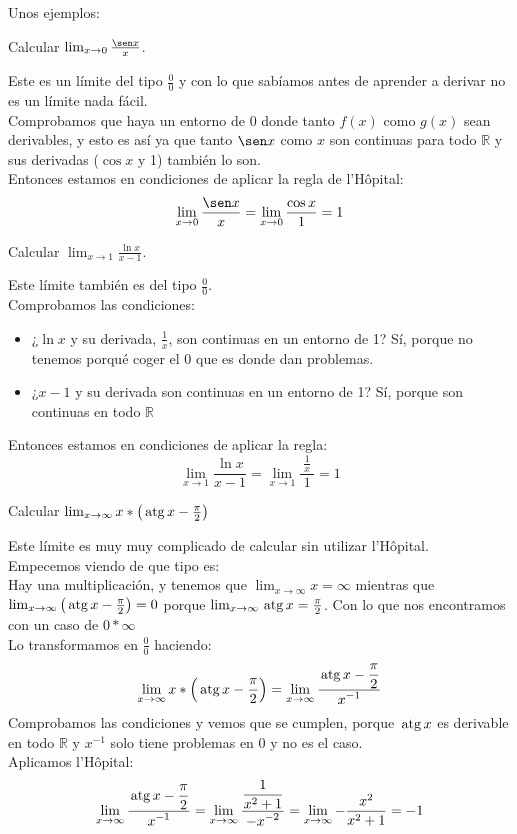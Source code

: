 \documentclass[a4paper,11pt,answers]{exam}
\newcommand\ddfrac[2]{\frac{\displaystyle #1}{\displaystyle #2}}
\begin{document}
Unos ejemplos:
\begin{questions}
\question Calcular $\lim_{x \to 0} \frac{\sen x}{x}$.
\begin{solution}
Este es un límite del tipo $\frac{0}{0}$ y con lo que sabíamos antes de aprender a derivar no es un límite nada fácil.\\ Comprobamos que haya un entorno de 0 donde tanto $f(x)$ como $g(x)$ sean derivables, y esto es así ya que tanto $\sen x$ como $x$ son continuas para todo $\mathbb{R}$ y sus derivadas ($\cos x$ y 1) también lo son.\\
Entonces estamos en condiciones de aplicar la regla de l'Hôpital:
\[\lim_{x \to 0} \frac{\sen x}{x} = \lim_{x \to 0} \frac{\cos x}{1} = 1\]
\end{solution}

\question Calcular $\lim_{x \to 1} \frac{\ln x}{x - 1}$.
\begin{solution}
Este límite también es del tipo $\frac{0}{0}$.\\
Comprobamos las condiciones:
\begin{itemize}
	\item ¿$\ln x$ y su derivada, $\frac{1}{x}$, son continuas en un entorno de 1? Sí, porque no tenemos porqué coger el 0 que es donde dan problemas.
	\item ¿$x -1$ y su derivada son continuas en un entorno de 1? Sí, porque son continuas en todo $\mathbb{R}$
\end{itemize}
Entonces estamos en condiciones de aplicar la regla:
\[\lim_{x \to 1} \frac{\ln x}{x - 1} = \lim_{x \to 1} \ddfrac{\ \frac{1}{x}\ }{1} = 1\]
\end{solution}
\question Calcular $\lim_{x \to \infty} x*\left(\,\mathrm{atg}\, x - \frac{\pi}{2}\right)$
\begin{solution}
Este límite es muy muy complicado de calcular sin utilizar l'Hôpital.\\
Empecemos viendo de que tipo es:\\
Hay una multiplicación, y tenemos que $\lim_{x \to \infty} x = \infty$ mientras que $\lim_{x \to \infty} \left(\,\mathrm{atg}\, x - \frac{\pi}{2}\right) = 0$ porque $\lim_{x \to \infty} \,\mathrm{atg}\, x = \frac{\pi}{2}$. Con lo que nos encontramos con un caso de $0*\infty$\\
Lo transformamos en $\frac{0}{0}$ haciendo:
\[\lim_{x \to \infty} x*\left(\atg x - \frac{\pi}{2}\right) = \lim_{x \to \infty} \ddfrac{\atg x - \frac{\pi}{2}}{x^{-1}}\]
Comprobamos las condiciones y vemos que se cumplen, porque $\,\mathrm{atg}\, x $ es derivable en todo $\mathbb{R}$ y $x^{-1}$ solo tiene problemas en 0 y no es el caso.\\
Aplicamos l'Hôpital:
\[ \lim_{x \to \infty} \ddfrac{\atg x - \frac{\pi}{2}}{x^{-1}} =  \lim_{x \to \infty} \ddfrac{\frac{1}{x^2 + 1}}{-x^{-2}} = 
 \lim_{x \to \infty} -\frac{x^2}{x^2 + 1} = -1\]
\end{solution}
\end{questions}
\end{document}
